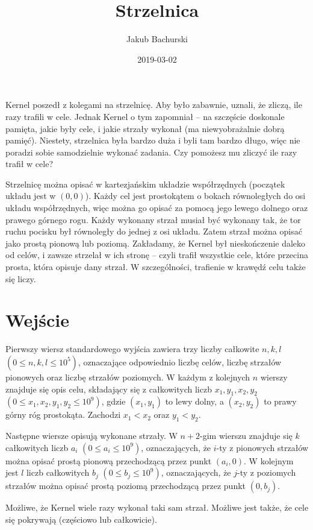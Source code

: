 \documentclass[zad,zawodnik,utf8]{sinol}
\title{Strzelnica}
\date{2019-03-02}
\author{Jakub Bachurski}
\begin{document}
\begin{tasktext}

\par Kernel poszedł z kolegami na strzelnicę. Aby było zabawnie, uznali, że zliczą, ile razy trafili w cele. Jednak Kernel o tym zapomniał -- na szczęście doskonale pamięta, jakie były cele, i jakie strzały wykonał (ma niewyobrażalnie dobrą pamięć). Niestety, strzelnica była bardzo duża i byli tam bardzo długo, więc nie poradzi sobie samodzielnie wykonać zadania. Czy pomożesz mu zliczyć ile razy trafił w cele?

\par Strzelnicę można opisać w kartezjańskim układzie współrzędnych (początek układu jest w $(0, 0)$). Każdy cel jest prostokątem o bokach równoległych do osi układu współrzędnych, więc można go opisać za pomocą jego lewego dolnego oraz prawego górnego rogu. Każdy wykonany strzał musiał być wykonany tak, że tor ruchu pocisku był równoległy do jednej z osi układu. Zatem strzał można opisać jako prostą pionową lub poziomą. Zakładamy, że Kernel był nieskończenie daleko od celów, i zawsze strzelał w ich stronę -- czyli trafił wszystkie cele, które przecina prosta, która opisuje dany strzał. W szczególności, trafienie w krawędź celu także się liczy.

\section{Wejście}

\par Pierwszy wiersz standardowego wyjścia zawiera trzy liczby całkowite $n, k, l$ $(0 \le n, k, l \le 10^5)$, oznaczające odpowiednio liczbę celów, liczbę strzałów pionowych oraz liczbę strzałów poziomych. W każdym z kolejnych $n$ wierszy znajduje się opis celu, składający się z całkowitych liczb $x_1, y_1, x_2, y_2$ $(0 \le x_1, x_2, y_1, y_2 \le 10^9)$, gdzie $(x_1, y_1)$ to lewy dolny, a $(x_2, y_2)$ to prawy górny róg prostokąta. Zachodzi $x_1 < x_2$ oraz $y_1 < y_2$.
\par Następne wiersze opisują wykonane strzały. W $n{+}2$-gim wierszu znajduje się $k$ całkowitych liczb $a_i$ $(0 \le a_i \le 10^9)$, oznaczających, że $i$-ty z pionowych strzałów można opisać prostą pionową przechodzącą przez punkt $(a_i, 0)$. W kolejnym jest $l$ liczb całkowitych $b_j$ $(0 \le b_j \le 10^9)$, oznaczających, że $j$-ty z poziomych strzałów można opisać prostą poziomą przechodzącą przez punkt $(0, b_j)$.
\par Możliwe, że Kernel wiele razy wykonał taki sam strzał. Możliwe jest także, że cele się pokrywają (częściowo lub całkowicie).


\end{tasktext}
\end{document}
